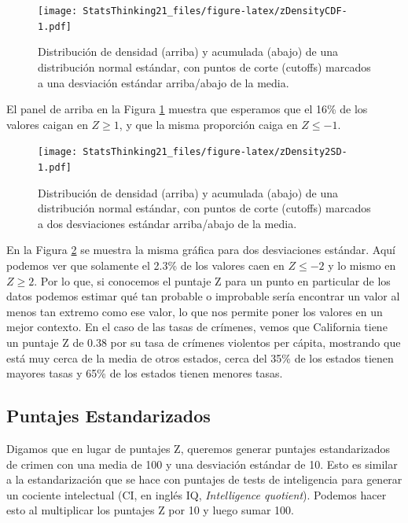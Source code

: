 \documentclass[
  12pt,
]{book}
\begin{document}
\begin{figure}
\centering
\texttt{[image: StatsThinking21\_files/figure-latex/zDensityCDF-1.pdf]}
\caption{\label{fig:zDensityCDF}Distribución de densidad (arriba) y acumulada (abajo) de una distribución normal estándar, con puntos de corte (cutoffs) marcados a una desviación estándar arriba/abajo de la media.}
\end{figure}

El panel de arriba en la Figura \ref{fig:zDensityCDF} muestra que esperamos que el 16\% de los valores caigan en \(Z\ge 1\), y que la misma proporción caiga en \(Z\le -1\).

\begin{figure}
\centering
\texttt{[image: StatsThinking21\_files/figure-latex/zDensity2SD-1.pdf]}
\caption{\label{fig:zDensity2SD}Distribución de densidad (arriba) y acumulada (abajo) de una distribución normal estándar, con puntos de corte (cutoffs) marcados a dos desviaciones estándar arriba/abajo de la media.}
\end{figure}

En la Figura \ref{fig:zDensity2SD} se muestra la misma gráfica para dos desviaciones estándar. Aquí podemos ver que solamente el 2.3\% de los valores caen en \(Z \le -2\) y lo mismo en \(Z \ge 2\). Por lo que, si conocemos el puntaje Z para un punto en particular de los datos podemos estimar qué tan probable o improbable sería encontrar un valor al menos tan extremo como ese valor, lo que nos permite poner los valores en un mejor contexto. En el caso de las tasas de crímenes, vemos que California tiene un puntaje Z de 0.38 por su tasa de crímenes violentos per cápita, mostrando que está muy cerca de la media de otros estados, cerca del 35\% de los estados tienen mayores tasas y 65\% de los estados tienen menores tasas.

\hypertarget{puntajes-estandarizados}{%
\subsection{Puntajes Estandarizados}\label{puntajes-estandarizados}}

Digamos que en lugar de puntajes Z, queremos generar puntajes estandarizados de crimen con una media de 100 y una desviación estándar de 10. Esto es similar a la estandarización que se hace con puntajes de tests de inteligencia para generar un cociente intelectual (CI, en inglés IQ, \emph{Intelligence quotient}). Podemos hacer esto al multiplicar los puntajes Z por 10 y luego sumar 100.
\end{document}
